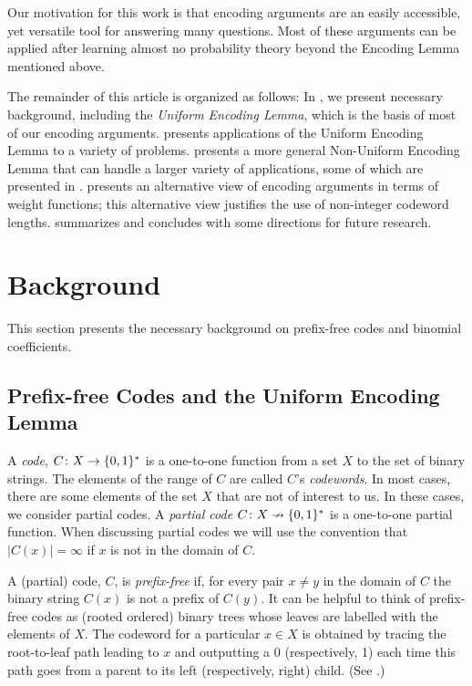 \documentclass{patmorin}
\begin{document}
Our motivation for this work is that encoding arguments are an easily
accessible, yet versatile tool for answering many questions.  Most of
these arguments can be applied after learning almost no probability
theory beyond the Encoding Lemma mentioned above.

The remainder of this article is organized as follows: In ,
we present necessary background, including the \emph{Uniform
Encoding Lemma}, which is the basis of most of our encoding arguments.
 presents  applications of the Uniform Encoding
Lemma to a variety of problems.   presents a more
general Non-Uniform Encoding Lemma that can handle a larger variety of
applications, some of which are presented in .
 presents an alternative view of encoding arguments in
terms of weight functions; this alternative view justifies the use of
non-integer codeword lengths.   summarizes and concludes
with some directions for future research.



\section{Background}

This section presents the necessary background on prefix-free codes and binomial coefficients.

\subsection{Prefix-free Codes and the Uniform Encoding Lemma}

A \emph{code}, $C\colon X\to \{0,1\}^*$ is a one-to-one function from a set
$X$ to the set of binary strings.  The elements of the range of $C$ are
called $C$'s \emph{codewords}.  In most cases, there are some elements of
the set $X$ that are not of interest to us.  In these cases, we consider
partial codes. A \emph{partial code} $C\colon X\nrightarrow \{0,1\}^*$ is
a one-to-one partial function.  When discussing partial codes we will use
the convention that $|C(x)|=\infty$ if $x$ is not in the domain of $C$.

A (partial) code, $C$, is \emph{prefix-free} if, for every pair $x\neq y$
in the domain of $C$ the binary string $C(x)$ is not a prefix of $C(y)$.
It can be helpful to think of prefix-free codes as (rooted ordered)
binary trees whose leaves are labelled with the elements of $X$.
The codeword for a particular $x\in X$ is obtained by tracing the
root-to-leaf path leading to $x$ and outputting a 0 (respectively, 1)
each time this path goes from a parent to its left (respectively, right)
child. (See .)
\end{document}
